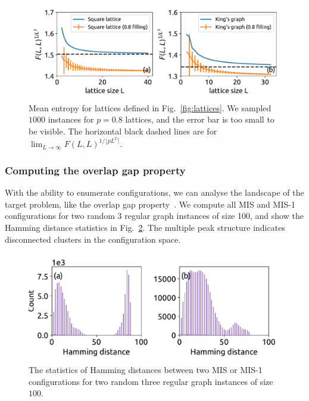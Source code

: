 \documentclass[onefignum, onetabnum]{siamart190516}
\newcommand{\<}{\langle}
\renewcommand{\>}{\rangle}
\newcommand{\Fig}[1]{Fig.~\ref{#1}}
\begin{document}
\begin{figure}[t] 
    \centering
    \includegraphics[width=\textwidth, trim={0cm 0cm 0cm 0cm}, clip]{figures/fig5.pdf}
    \caption{Mean entropy for lattices defined in \Fig{fig:lattices}.
    We sampled $1000$ instances for $p=0.8$ lattices, and the error bar is too small to be visible.
    The horizontal black dashed lines are for $\lim_{L\rightarrow \infty} F(L,L)^{1/\lfloor pL^2 \rceil}$.
    }
    \label{fig:hardsquare}
\end{figure}

\subsubsection{Computing the overlap gap property}

With the ability to enumerate configurations, we can analyse the landscape of the target problem, like the overlap gap property~\cite{Gamarnik2013, Gamarnik2019}.
We compute all MIS and MIS-1 configurations for two random 3 regular graph instances of size 100, and show the Hamming distance statistics in \Fig{fig:hamming}.
The multiple peak structure indicates disconnected clusters in the configuration space.
\begin{figure} 
    \centering
    \includegraphics[width=\textwidth, trim={0cm 0cm 0cm 0cm}, clip]{figures/fig3.pdf}
    \caption{The statistics of Hamming distances between two MIS or MIS-1 configurations for two random three regular graph instances of size $100$.}
    \label{fig:hamming}
\end{figure}
\end{document}
